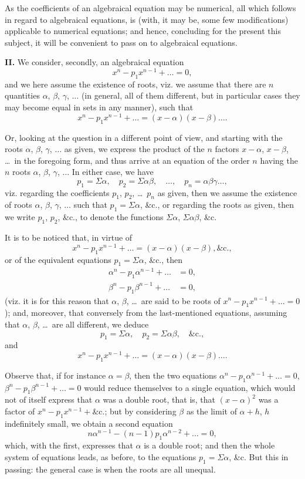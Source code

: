 \documentclass[12pt,a4paper]{article}
\theoremstyle{plain}
\theoremstyle{definition}
\theoremstyle{remark}
\begin{document}
As the coefficients of an algebraical equation may be numerical, all which follows in regard to algebraical equations, is (with, it may be, some few modifications) applicable to numerical equations; and hence, concluding for the present this subject, it will be convenient to pass on to algebraical equations.

\medskip\noindent\textbf{II.} We consider, secondly, an algebraical equation
\[
x^n - p_1 x^{n-1} + \ldots = 0,
\]
and we here assume the existence of roots, viz. we assume that there are $n$ quantities $\alpha$, $\beta$, $\gamma$, $\ldots$ (in general, all of them different, but in particular cases they may become equal in sets in any manner), such that
\[
x^n - p_1 x^{n-1} + \ldots = (x-\alpha)(x-\beta)\ldots.
\]

Or, looking at the question in a different point of view, and starting with the roots $\alpha$, $\beta$, $\gamma$, $\ldots$ as given, we express the product of the $n$ factors $x-\alpha$, $x-\beta$, \ldots\ in the foregoing form, and thus arrive at an equation of the order $n$ having the $n$ roots $\alpha$, $\beta$, $\gamma$, $\ldots$ In either case, we have
\[
p_1 = \Sigma\alpha, \quad p_2 = \Sigma\alpha\beta, \quad \ldots, \quad p_n = \alpha\beta\gamma\ldots,
\]
viz. regarding the coefficients $p_1$, $p_2$, \ldots\ $p_n$ as given, then we assume the existence of roots $\alpha$, $\beta$, $\gamma$, $\ldots$ such that $p_1 = \Sigma\alpha$, \&c., or regarding the roots as given, then we write $p_1$, $p_2$, \&c., to denote the functions $\Sigma\alpha$, $\Sigma\alpha\beta$, \&c.

It is to be noticed that, in virtue of
\[
x^n - p_1 x^{n-1} + \ldots = (x-\alpha)(x-\beta), \&\text{c.},
\]
or of the equivalent equations $p_1 = \Sigma\alpha$, \&c., then
\begin{align*}
\alpha^n - p_1 \alpha^{n-1} + \ldots &= 0, \\
\beta^n - p_1 \beta^{n-1} + \ldots &= 0,
\end{align*}
(viz. it is for this reason that $\alpha$, $\beta$, \ldots\ are said to be roots of $x^n - p_1 x^{n-1} + \ldots = 0$); and, moreover, that conversely from the last-mentioned equations, assuming that $\alpha$, $\beta$, \ldots\ are all different, we deduce
\[
p_1 = \Sigma\alpha, \quad p_2 = \Sigma\alpha\beta, \quad \&\text{c.},
\]
and
\[
x^n - p_1 x^{n-1} + \ldots = (x-\alpha)(x-\beta)\ldots.
\]

Observe that, if for instance $\alpha = \beta$, then the two equations $\alpha^n - p_1 \alpha^{n-1} + \ldots = 0$, $\beta^n - p_1 \beta^{n-1} + \ldots = 0$ would reduce themselves to a single equation, which would not of itself express that $\alpha$ was a double root, that is, that $(x-\alpha)^2$ was a factor of $x^n - p_1 x^{n-1} + \&\text{c.}$; but by considering $\beta$ as the limit of $\alpha + h$, $h$ indefinitely small, we obtain a second equation
\[
n\alpha^{n-1} - (n-1)p_1 \alpha^{n-2} + \ldots = 0,
\]
which, with the first, expresses that $\alpha$ is a double root; and then the whole system of equations leads, as before, to the equations $p_1 = \Sigma\alpha$, \&c. But this in passing: the general case is when the roots are all unequal.
\end{document}
